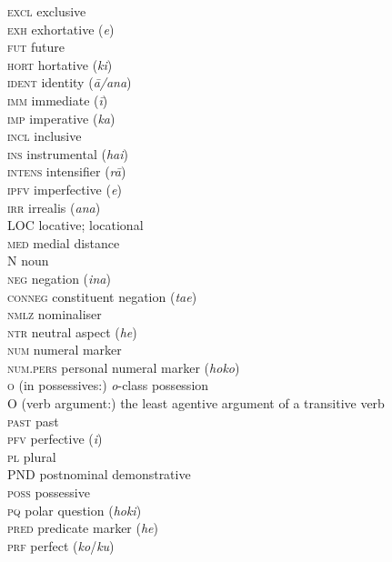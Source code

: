\begin{tabbing}
{\scshape excl} \> exclusive\\
{\scshape exh} \> {exhortative (\textit{e})}\\
{\scshape fut} \> future\\
{\scshape hort} \> hortative (\textit{ki})\\
{\scshape ident} \> identity (\textit{{\ꞌ}ā/{\ꞌ}ana})\\
{\scshape imm} \> immediate (\textit{{\ꞌ}ī})\\
{\scshape imp} \> {imperative (\textit{ka})}\\
{\scshape incl} \> inclusive\\
{\scshape ins} \> instrumental (\textit{hai})\\
{\scshape intens} \> intensifier (\textit{rā})\\
{\scshape ipfv} \> imperfective (\textit{e})\\
{\scshape irr} \> irrealis (\textit{ana})\\
LOC \> locative; locational\\
{\scshape med} \> medial distance\\
N \> noun\\
{\scshape neg} \> negation (\textit{{\ꞌ}ina})\\
{\scshape conneg} \> constituent negation (\textit{ta{\ꞌ}e})\\
{\scshape nmlz} \> nominaliser\\
{\scshape ntr} \> neutral aspect (\textit{he})\\
{\scshape num} \> numeral marker\\
{\scshape num.pers} \> personal numeral marker (\textit{hoko})\\
\textsc{o} \> (in possessives:) \textit{o}{}-class possession\\
O \> (verb argument:) the least agentive argument of a transitive verb\\
{\scshape past} \> past\\
{\scshape pfv} \> perfective (\textit{i})\\
{\scshape pl} \> plural\\
PND \> {postnominal demonstrative}\\
{\scshape poss} \> possessive\\
{\scshape pq} \> polar question (\textit{hoki})\\
{\scshape pred} \> predicate marker (\textit{he})\\
{\scshape prf} \> perfect (\textit{ko}/\textit{ku})\\

\end{tabbing}
